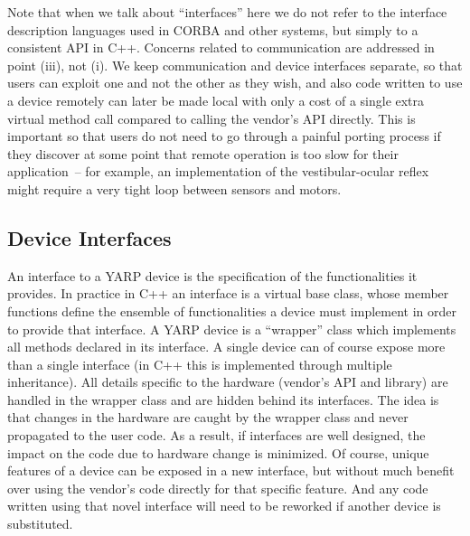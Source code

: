 Note that when we talk about ``interfaces'' here we do not refer to
the interface description languages used in CORBA and other systems,
but simply to a consistent API in C++.  Concerns related to
communication are addressed in point (iii), not (i).  We keep
communication and device interfaces separate, so that users can
exploit one and not the other as they wish, and also code written to
use a device remotely can later be made local with only a cost of a
single extra virtual method call compared to calling the vendor's API directly.
This is important so that users do not need to go through a painful
porting process if they discover at some point that remote operation
is too slow for their application~-- for example, an implementation
of the vestibular-ocular reflex might require a very tight loop
between sensors and motors.


\subsection{Device Interfaces}
An interface to a YARP device is the specification of the functionalities
it provides. In practice in C++ an interface is a virtual base class, whose 
member functions define the ensemble of  functionalities a device must 
implement in order to provide that interface.  A YARP device is a 
``wrapper'' class which implements all methods declared in its interface. 
A single device can of course expose more than a single interface 
(in C++ this is implemented through multiple
inheritance). All details specific to the hardware 
(vendor's API and library) are handled in the wrapper class and are 
hidden behind its interfaces. 
The idea is that changes in the hardware are caught by the wrapper class 
and never propagated to the user code. As a result, if interfaces are 
well designed, the impact on the code due to hardware change is minimized. 
%
Of course, unique features of a device can be exposed in a new interface,
but without much benefit over using the vendor's code directly for that
specific feature.  And any code written using that novel interface will
need to be reworked if another device is substituted.

